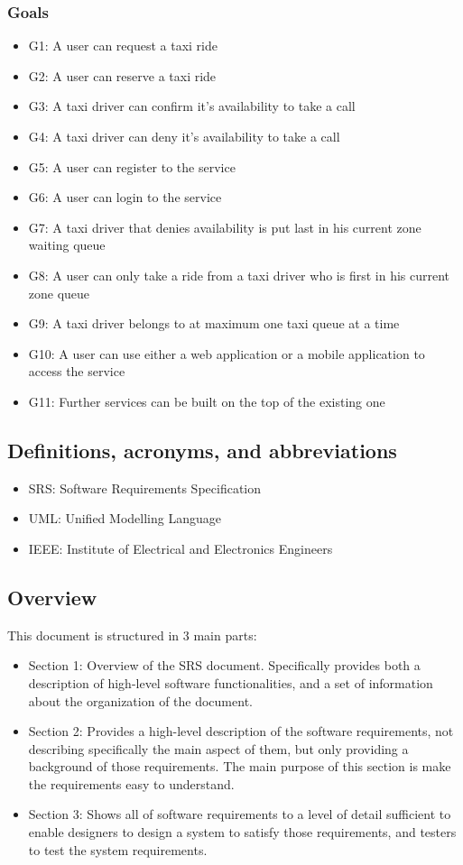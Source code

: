 \subsubsection{Goals}
\begin{itemize}
	\item G1: A user can request a taxi ride
	\item G2: A user can reserve a taxi ride
	\item G3: A taxi driver can confirm it's availability to take a call
	\item G4: A taxi driver can deny it's availability to take a call
	\item G5: A user can register to the service
	\item G6: A user can login to the service
	\item G7: A taxi driver that denies availability is put last in his current zone waiting queue
	\item G8: A user can only take a ride from a taxi driver who is first in his current zone queue
	\item G9: A taxi driver belongs to at maximum one taxi queue at a time
	\item G10: A user can use either a web application or a mobile application to access the service
	\item G11: Further services can be built on the top of the existing one
\end{itemize}
\subsection{Definitions, acronyms, and abbreviations}
\begin{itemize}
	\item SRS: Software Requirements Specification
	\item UML: Unified Modelling Language
	\item IEEE: Institute of Electrical and Electronics Engineers
\end{itemize}
\subsection{Overview}
This document is structured in 3 main parts:
\begin{itemize}
	\item Section 1: Overview of the SRS document. Specifically provides both a description of high-level software functionalities, and a set of information about the organization of the document.
	\item Section 2: Provides a high-level description of the software requirements, not describing specifically the main aspect of them, but only providing a background of those requirements. The main purpose of this section is make the requirements easy to understand.
	\item Section 3: Shows all of software requirements to a level of detail sufficient to enable designers to design a system to satisfy those requirements, and testers to test the system requirements.
\end{itemize}
